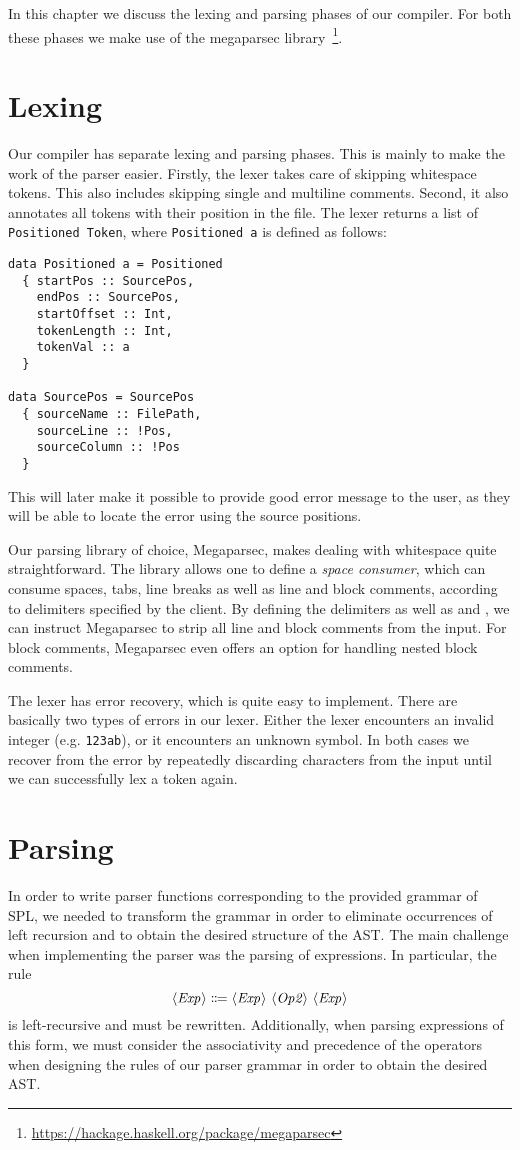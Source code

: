 In this chapter we discuss the lexing and parsing phases of our compiler.
For both these phases we make use of the megaparsec
library~\footnote{\url{https://hackage.haskell.org/package/megaparsec}}.

\section{Lexing}
Our compiler has separate lexing and parsing phases.
This is mainly to make the work of the parser easier.
Firstly, the lexer takes care of skipping whitespace tokens.
This also includes skipping single and multiline comments.
Second, it also annotates all tokens with their position in the file.
The lexer returns a list of \texttt{Positioned Token},
where \texttt{Positioned a} is defined as follows:
\begin{verbatim}
data Positioned a = Positioned
  { startPos :: SourcePos,
    endPos :: SourcePos,
    startOffset :: Int,
    tokenLength :: Int,
    tokenVal :: a
  }

data SourcePos = SourcePos
  { sourceName :: FilePath,
    sourceLine :: !Pos,
    sourceColumn :: !Pos
  }
\end{verbatim}
This will later make it possible to provide good error message to the user,
as they will be able to locate the error using the source positions.

Our parsing library of choice, Megaparsec, makes dealing with whitespace quite
straightforward. The library allows one to define a \emph{space consumer}, which
can consume spaces, tabs, line breaks as well as line and block comments,
according to delimiters specified by the client.
By defining the delimiters \code{//} as well as \code{/*} and \code{*/}, we can
instruct Megaparsec to strip all line and block comments from the input.
For block comments, Megaparsec even offers an option for handling nested block
comments.

The lexer has error recovery, which is quite easy to implement.
There are basically two types of errors in our lexer.
Either the lexer encounters an invalid integer (e.g. \verb|123ab|),
or it encounters an unknown symbol.
In both cases we recover from the error by repeatedly discarding characters from
the input until we can successfully lex a token again.


\section{Parsing}
In order to write parser functions corresponding to the provided grammar of SPL,
we needed to transform the grammar in order to eliminate occurrences of left
recursion and to obtain the desired structure of the AST.
The main challenge when implementing the parser was the parsing of expressions.
In particular, the rule
\[ \NT{Exp} \Coloneqq \NT{Exp}\ \NT{Op2}\ \NT{Exp} \]
is left-recursive and must be rewritten.
Additionally, when parsing expressions of this form, we must consider the
associativity and precedence of the operators when designing the rules of our
parser grammar in order to obtain the desired AST.

